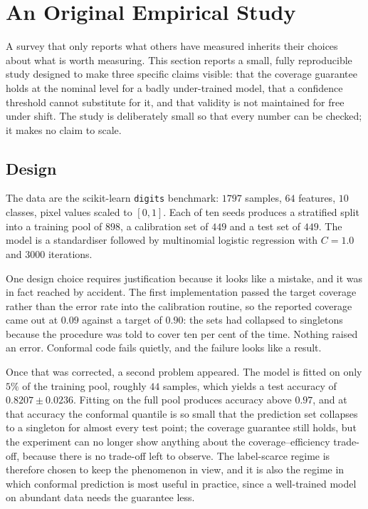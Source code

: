 \documentclass[a4paper,longmktitle]{cas-sc}
\begin{document}
\section{An Original Empirical Study}
\label{sec:experiments}

A survey that only reports what others have measured inherits their choices about what is worth measuring. This section reports a small, fully reproducible study designed to make three specific claims visible: that the coverage guarantee holds at the nominal level for a badly under-trained model, that a confidence threshold cannot substitute for it, and that validity is not maintained for free under shift. The study is deliberately small so that every number can be checked; it makes no claim to scale.

\subsection{Design}

The data are the scikit-learn \texttt{digits} benchmark: $1797$ samples, $64$ features, $10$ classes, pixel values scaled to $[0,1]$. Each of ten seeds produces a stratified split into a training pool of $898$, a calibration set of $449$ and a test set of $449$. The model is a standardiser followed by multinomial logistic regression with $C=1.0$ and $3000$ iterations.

One design choice requires justification because it looks like a mistake, and it was in fact reached by accident. The first implementation passed the target coverage rather than the error rate into the calibration routine, so the reported coverage came out at $0.09$ against a target of $0.90$: the sets had collapsed to singletons because the procedure was told to cover ten per cent of the time. Nothing raised an error. Conformal code fails quietly, and the failure looks like a result.

Once that was corrected, a second problem appeared. The model is fitted on only $5\%$ of the training pool, roughly $44$ samples, which yields a test accuracy of $0.8207\pm0.0236$. Fitting on the full pool produces accuracy above $0.97$, and at that accuracy the conformal quantile is so small that the prediction set collapses to a singleton for almost every test point; the coverage guarantee still holds, but the experiment can no longer show anything about the coverage--efficiency trade-off, because there is no trade-off left to observe. The label-scarce regime is therefore chosen to keep the phenomenon in view, and it is also the regime in which conformal prediction is most useful in practice, since a well-trained model on abundant data needs the guarantee less.
\end{document}
